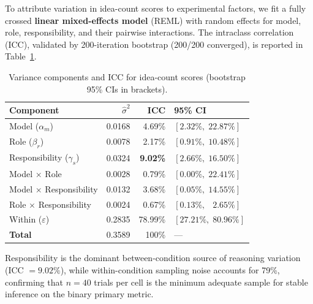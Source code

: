 To attribute variation in idea-count scores to experimental factors, we fit a fully crossed
\textbf{linear mixed-effects model} (REML) with random effects for model, role,
responsibility, and their pairwise interactions.  The intraclass correlation (ICC), validated
by 200-iteration bootstrap (200/200 converged), is reported in Table~\ref{tab:icc}.

\begin{table}[h]
\centering
\caption{Variance components and ICC for idea-count scores (bootstrap 95\% CIs in brackets).}
\label{tab:icc}
\setlength{\tabcolsep}{6pt}
\begin{tabular}{lrrl}
\hline
\textbf{Component} & $\hat{\sigma}^2$ & \textbf{ICC} & \textbf{95\% CI} \\
\hline
Model ($\alpha_m$)            & 0.0168 & 4.69\%          & $[2.32\%,\;22.87\%]$ \\
Role ($\beta_r$)              & 0.0078 & 2.17\%          & $[0.91\%,\;10.48\%]$ \\
Responsibility ($\gamma_s$)   & 0.0324 & \textbf{9.02\%} & $[2.66\%,\;16.50\%]$ \\
Model $\times$ Role           & 0.0028 & 0.79\%          & $[0.00\%,\;22.41\%]$ \\
Model $\times$ Responsibility & 0.0132 & 3.68\%          & $[0.05\%,\;14.55\%]$ \\
Role $\times$ Responsibility  & 0.0024 & 0.67\%          & $[0.13\%,\;\phantom{0}2.65\%]$ \\
Within ($\varepsilon$)        & 0.2835 & 78.99\%         & $[27.21\%,\;80.96\%]$ \\
\hline
\textbf{Total}                & 0.3589 & 100\%           & --- \\
\hline
\end{tabular}
\end{table}

Responsibility is the dominant between-condition source of reasoning variation
(ICC $= 9.02\%$), while within-condition sampling noise accounts for 79\%, confirming that
$n = 40$ trials per cell is the minimum adequate sample for stable inference on the binary
primary metric.



